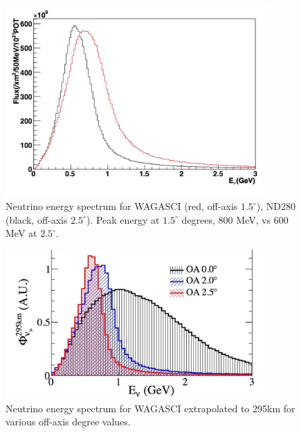 
\begin{figure}[h!]
\centering
\includegraphics[width=0.9\textwidth]{figures/NeutrinoChap/ND280vsWAGASCIspectrum.jpeg}
\caption{Neutrino energy spectrum for WAGASCI (red, off-axis $1.5^\circ$), ND280 (black, off-axis $2.5^\circ$). Peak energy at $1.5^\circ$ degrees, 800 MeV, vs 600 MeV at $2.5^\circ$.}
\label{fig:T2KAxis}
\end{figure}

\begin{figure}[h!]
\centering
\includegraphics[width=0.9\textwidth]{figures/NeutrinoChap/offAxisFlux.jpeg}
\caption{Neutrino energy spectrum for WAGASCI extrapolated to 295km for various off-axis degree values.}
\label{fig:T2KAxis2}
\end{figure}


